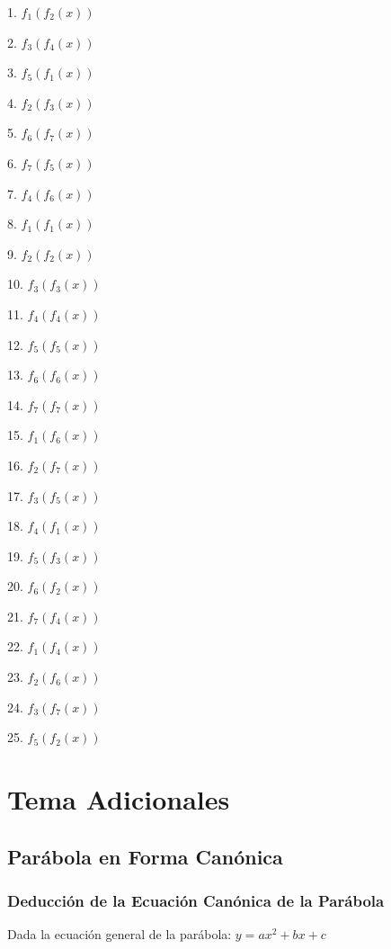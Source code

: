 \documentclass[]{book}
\begin{document}
\begin{multicols}{3}
    1. $f_1(f_2(x))$

    2. $f_3(f_4(x))$

    3. $f_5(f_1(x))$

    4. $f_2(f_3(x))$

    5. $f_6(f_7(x))$

    6. $f_7(f_5(x))$

    7. $f_4(f_6(x))$

    8. $f_1(f_1(x))$

    9. $f_2(f_2(x))$

    10. $f_3(f_3(x))$

    11. $f_4(f_4(x))$

    12. $f_5(f_5(x))$

    13. $f_6(f_6(x))$

    14. $f_7(f_7(x))$

    15. $f_1(f_6(x))$

    16. $f_2(f_7(x))$

    17. $f_3(f_5(x))$

    18. $f_4(f_1(x))$

    19. $f_5(f_3(x))$

    20. $f_6(f_2(x))$

    21. $f_7(f_4(x))$

    22. $f_1(f_4(x))$

    23. $f_2(f_6(x))$

    24. $f_3(f_7(x))$

    25. $f_5(f_2(x))$
    
\end{multicols}

\chapter{Tema Adicionales}\label{tema-adicionales}

\section{Parábola en Forma
Canónica}\label{paruxe1bola-en-forma-canuxf3nica}

\subsection{Deducción de la Ecuación Canónica de la
Parábola}\label{deducciuxf3n-de-la-ecuaciuxf3n-canuxf3nica-de-la-paruxe1bola}

Dada la ecuación general de la parábola: \(y = ax^2 + bx + c\)
\end{document}
